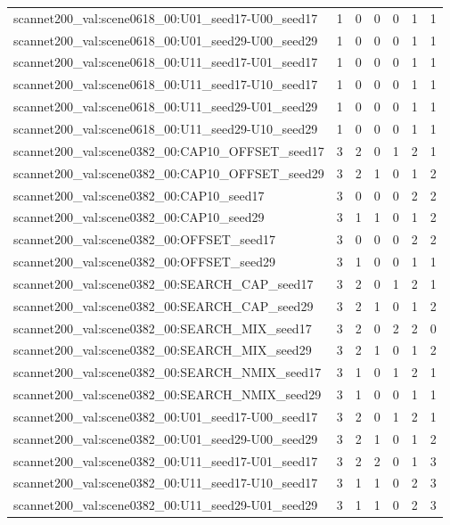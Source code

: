 \begin{table}[t]
\begin{tabular}{lrrrrrr}
scannet200\_val:scene0618\_00:U01\_seed17-U00\_seed17 & 1 & 0 & 0 & 0 & 1 & 1 \\
scannet200\_val:scene0618\_00:U01\_seed29-U00\_seed29 & 1 & 0 & 0 & 0 & 1 & 1 \\
scannet200\_val:scene0618\_00:U11\_seed17-U01\_seed17 & 1 & 0 & 0 & 0 & 1 & 1 \\
scannet200\_val:scene0618\_00:U11\_seed17-U10\_seed17 & 1 & 0 & 0 & 0 & 1 & 1 \\
scannet200\_val:scene0618\_00:U11\_seed29-U01\_seed29 & 1 & 0 & 0 & 0 & 1 & 1 \\
scannet200\_val:scene0618\_00:U11\_seed29-U10\_seed29 & 1 & 0 & 0 & 0 & 1 & 1 \\
scannet200\_val:scene0382\_00:CAP10\_OFFSET\_seed17 & 3 & 2 & 0 & 1 & 2 & 1 \\
scannet200\_val:scene0382\_00:CAP10\_OFFSET\_seed29 & 3 & 2 & 1 & 0 & 1 & 2 \\
scannet200\_val:scene0382\_00:CAP10\_seed17 & 3 & 0 & 0 & 0 & 2 & 2 \\
scannet200\_val:scene0382\_00:CAP10\_seed29 & 3 & 1 & 1 & 0 & 1 & 2 \\
scannet200\_val:scene0382\_00:OFFSET\_seed17 & 3 & 0 & 0 & 0 & 2 & 2 \\
scannet200\_val:scene0382\_00:OFFSET\_seed29 & 3 & 1 & 0 & 0 & 1 & 1 \\
scannet200\_val:scene0382\_00:SEARCH\_CAP\_seed17 & 3 & 2 & 0 & 1 & 2 & 1 \\
scannet200\_val:scene0382\_00:SEARCH\_CAP\_seed29 & 3 & 2 & 1 & 0 & 1 & 2 \\
scannet200\_val:scene0382\_00:SEARCH\_MIX\_seed17 & 3 & 2 & 0 & 2 & 2 & 0 \\
scannet200\_val:scene0382\_00:SEARCH\_MIX\_seed29 & 3 & 2 & 1 & 0 & 1 & 2 \\
scannet200\_val:scene0382\_00:SEARCH\_NMIX\_seed17 & 3 & 1 & 0 & 1 & 2 & 1 \\
scannet200\_val:scene0382\_00:SEARCH\_NMIX\_seed29 & 3 & 1 & 0 & 0 & 1 & 1 \\
scannet200\_val:scene0382\_00:U01\_seed17-U00\_seed17 & 3 & 2 & 0 & 1 & 2 & 1 \\
scannet200\_val:scene0382\_00:U01\_seed29-U00\_seed29 & 3 & 2 & 1 & 0 & 1 & 2 \\
scannet200\_val:scene0382\_00:U11\_seed17-U01\_seed17 & 3 & 2 & 2 & 0 & 1 & 3 \\
scannet200\_val:scene0382\_00:U11\_seed17-U10\_seed17 & 3 & 1 & 1 & 0 & 2 & 3 \\
scannet200\_val:scene0382\_00:U11\_seed29-U01\_seed29 & 3 & 1 & 1 & 0 & 2 & 3 \\

\end{tabular}
\end{table}
